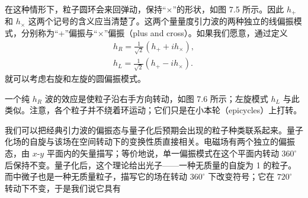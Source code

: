 在这种情形下，粒子圆环会来回弹动，保持“$\times$”的形状，如图 7.5 所示。因此 $h_+$ 和 $h_\times$ 这两个记号的含义应当清楚了。这两个量量度引力波的两种独立的线偏振模式，分别称为“+”偏振与“$\times$”偏振（plus and cross）。如果我们愿意，通过定义
\begin{gather*}
h_R = \frac{1}{\sqrt{2}}(h_+ + ih_\times), \\
h_L = \frac{1}{\sqrt{2}}(h_+ - ih_\times).
\tag{7.116}
\end{gather*}
就可以考虑右旋和左旋的圆偏振模式。

一个纯 $h_R$ 波的效应是使粒子沿右手方向转动，如图 7.6 所示；左旋模式 $h_L$ 与此类似。注意，各个粒子并不绕着环运动；它们只是在小本轮（epicycles）上打转。

我们可以把经典引力波的偏振态与量子化后预期会出现的粒子种类联系起来。量子化场的自旋与该场在空间转动下的变换性质直接相关。电磁场有两个独立的偏振态，由 $x$-$y$ 平面内的矢量描写；等价地说，单一偏振模式在这个平面内转动 $360^{\circ}$ 后保持不变。量子化后，这个理论给出光子——一种无质量的自旋为 1 的粒子。而中微子也是一种无质量粒子，描写它的场在转动 $360^{\circ}$ 下改变符号；它在 $720^{\circ}$ 转动下不变，于是我们说它具有

